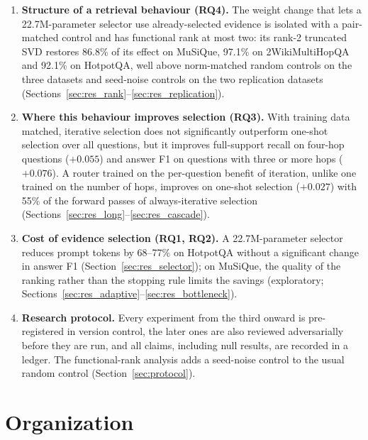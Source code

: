 \begin{enumerate}
  \item \textbf{Structure of a retrieval behaviour (RQ4).} The weight change that lets a 22.7M-parameter selector use already-selected evidence is isolated with a pair-matched control and has functional rank at most two: its rank-2 truncated SVD restores 86.8\% of its effect on MuSiQue, 97.1\% on 2WikiMultiHopQA and 92.1\% on HotpotQA, well above norm-matched random controls on the three datasets and seed-noise controls on the two replication datasets (Sections~\ref{sec:res_rank}--\ref{sec:res_replication}).
  \item \textbf{Where this behaviour improves selection (RQ3).} With training data matched, iterative selection does not significantly outperform one-shot selection over all questions, but it improves full-support recall on four-hop questions ($+0.055$) and answer F1 on questions with three or more hops ($+0.076$). A router trained on the per-question benefit of iteration, unlike one trained on the number of hops, improves on one-shot selection ($+0.027$) with 55\% of the forward passes of always-iterative selection (Sections~\ref{sec:res_long}--\ref{sec:res_cascade}).
  \item \textbf{Cost of evidence selection (RQ1, RQ2).} A 22.7M-parameter selector reduces prompt tokens by 68--77\% on HotpotQA without a significant change in answer F1 (Section~\ref{sec:res_selector}); on MuSiQue, the quality of the ranking rather than the stopping rule limits the savings (exploratory; Sections~\ref{sec:res_adaptive}--\ref{sec:res_bottleneck}).
  \item \textbf{Research protocol.} Every experiment from the third onward is pre-registered in version control, the later ones are also reviewed adversarially before they are run, and all claims, including null results, are recorded in a ledger. The functional-rank analysis adds a seed-noise control to the usual random control (Section~\ref{sec:protocol}).
\end{enumerate}

\section{Organization}

